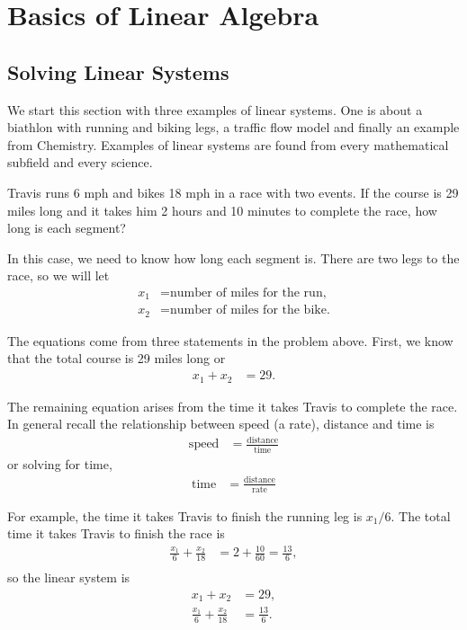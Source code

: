 

\chapter{Basics of Linear Algebra}

\section{Solving Linear Systems} \label{sect:linear:syst}

We start this section with three examples of linear systems.  One is about a bi\-ath\-lon with running and biking legs, a traffic flow model and finally an example from Chemistry.  Examples of linear systems are found from every mathematical subfield and every science.

\begin{example} \label{ex:biathlon}
Travis runs 6 mph and bikes 18 mph in a race with two events.  If the course is 29 miles long and it takes him 2 hours and 10 minutes to complete the race,  how long is each segment?

\solution

In this case, we need to know how long each segment is.  There are two legs to the race, so we will let
\begin{align*}
x_1 & = \text{number of miles for the run,}\\
x_2 & = \text{number of miles for the bike.}
\end{align*}


The equations come from three statements in the problem above.  First, we know that the total course is 29 miles long or
%
\begin{align*}
	x_1+x_2&=29.
\end{align*}

The remaining equation arises from the time it takes Travis to complete the race.  In general recall the relationship between speed (a rate), distance and time is
\begin{align*}
	\text{speed} & = \frac{\text{distance}}{\text{time}}
\end{align*}
or solving for time,
\begin{align*}
	\text{time} & =\frac{\text{distance}}{\text{rate}}
\end{align*}

For example, the time it takes Travis to finish the running leg is $x_1/6$.  The total time it takes Travis to finish the race is
%
\begin{align*}
\frac{x_1}{6} + \frac{x_2}{18}  & = 2+ \frac{10}{60} = \frac{13}{6}, \\
\end{align*}
%
so the linear system is
%
\begin{align*}
x_1+x_2&=29, \\
\frac{x_1}{6} + \frac{x_2}{18} & =\frac{13}{6}.\\
\end{align*}

\end{example}

